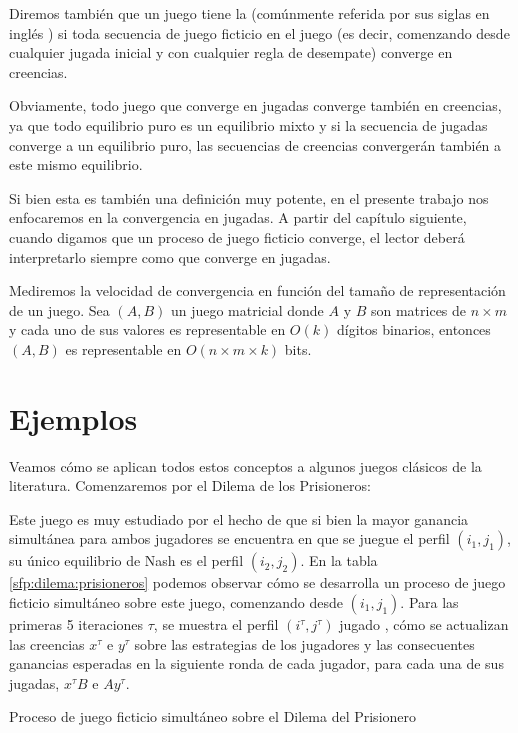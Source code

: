 Diremos también que un juego tiene la  (comúnmente referida por sus siglas en inglés ) si toda secuencia de juego ficticio en el juego (es decir, comenzando desde cualquier jugada inicial y con cualquier regla de desempate) converge en creencias.

Obviamente, todo juego que converge en jugadas converge también en creencias, ya que todo equilibrio puro es un equilibrio mixto y si la secuencia de jugadas converge a un equilibrio puro, las secuencias de creencias convergerán también a este mismo equilibrio.

Si bien esta es también una definición muy potente, en el presente trabajo nos enfocaremos en la convergencia en jugadas. A partir del capítulo siguiente, cuando digamos que un proceso de juego ficticio converge, el lector deberá interpretarlo siempre como que converge en jugadas.

Mediremos la velocidad de convergencia en función del tamaño de representación de un juego. Sea $(A, B)$ un juego matricial donde $A$ y $B$ son matrices de $n \times m$ y cada uno de sus valores es representable en $O(k)$ dígitos binarios, entonces $(A, B)$ es representable en $O(n \times m \times k)$ bits.


\section{Ejemplos}

Veamos cómo se aplican todos estos conceptos a algunos juegos clásicos de la literatura. Comenzaremos por el Dilema de los Prisioneros:




Este juego es muy estudiado por el hecho de que si bien la mayor ganancia simultánea para ambos jugadores se encuentra en que se juegue el perfil $(i_1, j_1)$, su único equilibrio de Nash es el perfil $(i_2, j_2)$. En la tabla \ref{sfp:dilema:prisioneros} podemos observar cómo se desarrolla un proceso de juego ficticio simultáneo sobre este juego, comenzando desde $(i_1, j_1)$. Para las primeras 5 iteraciones $\tau$, se muestra el perfil $(i^\tau, j^\tau)$ jugado , cómo se actualizan las creencias $x^\tau$ e $y^\tau$ sobre las estrategias de los jugadores y las consecuentes ganancias esperadas en la siguiente ronda de cada jugador, para cada una de sus jugadas, $x^\tau B$ e $A y^\tau$.

\begin{table} %
    \centering
    
    \caption{Proceso de juego ficticio simultáneo sobre el Dilema del Prisionero}
    \label{sfp:dilema:prisioneros}
\end{table}

